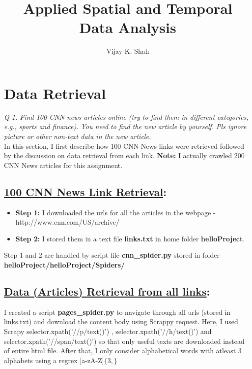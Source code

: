 \documentclass[journal,onecolumn]{IEEEtran}
\title{Applied Spatial and Temporal Data Analysis}
\author{Vijay K. Shah}
\begin{document}
\maketitle

\section{\textbf{Data Retrieval}}

\textit{Q 1. Find 100 CNN news articles online (try to find them in different categories, e.g., sports and
finance). You need to find the new article by yourself. Pls ignore picture or other non-text data
in the new article.} \\

In this section, I first describe how 100 CNN News links were retrieved followed by the discussion on data retrieval from each link. \textbf{Note:} I actually crawled 200 CNN News articles for this assignment.

\subsection{\underline{100 CNN News Link Retrieval}:}

\begin{itemize}[label={}]
\item \textbf{Step 1:} I downloaded the urls for all the articles in the webpage - http://www.cnn.com/US/archive/

\item \textbf{Step 2:} I stored them in a text file \textbf{links.txt} in home folder \textbf{helloProject}. 

\end{itemize}
Step 1 and 2 are handled by script file \textbf{cnn\_spider.py} stored in folder \textbf{helloProject/helloProject/Spiders/}


\subsection{\underline{Data (Articles) Retrieval from all links}:}

I created a script \textbf{pages\_spider.py} to navigate through all urls (stored in links.txt) and download the content body using Scrappy request. Here, I used Scrapy selector.xpath('//p/text()') ,  selector.xpath('//h/text()') and  selector.xpath('//span/text()') so that only useful texts are downloaded instead of entire html file. After that, I only consider alphabetical words with atleast 3 alphabets using a regrex [a-zA-Z]$\{3,\}$ \\
\end{document}
